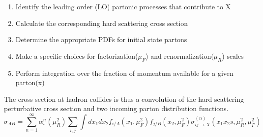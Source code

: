 \begin{enumerate}
	\item Identify the leading order (LO) partonic processes that contribute to X
	\item Calculate the corresponding hard scattering cross section
	\item Determine the appropriate PDFs for initial state partons
	\item Make a specific choices for factorization($\mu_F$) and renormalization($\mu_R$) scales
	\item Perform integration over the fraction of momentum available for a given parton(x)  
\end{enumerate}
The cross section at hadron collides is thus a convolution of the hard scattering perturbative cross section and two incoming parton distribution functions.
\begin{equation}
\sigma_{AB} = \sum\limits_{n=1}^{\infty} \alpha_{s}^{n}(\mu_{R}^2)\sum\limits_{i,j} \int dx_1 dx_2 f_{i/A}(x_1,\mu_{F}^2) f_{j/B}(x_2,\mu_{F}^2) \sigma_{ij \rightarrow X}^{(n)}(x_1 x_2s,\mu_{R}^2,\mu_{F}^2)
 \label{eq:xsec}
\end{equation} 	

